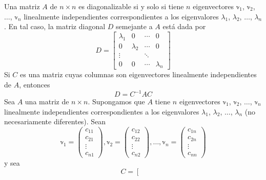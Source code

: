 \begin{theorem}
    Una matriz $A$ de $n \times n$ es diagonalizable si y solo si tiene $n$ eigenvectores $\mathbb{v}_1$, $\mathbb{v}_2$, $\dots$, $\mathbb{v}_n$ linealmente independientes correspondientes a los eigenvalores $\lambda_1$, $\lambda_2$, $\dots$, $\lambda_n$. En tal caso, la matriz diagonal $D$ semejante a $A$ está dada por
    $$D = \begin{bmatrix}
        \lambda_1 & 0 & \cdots & 0 \\
        0 & \lambda_2 & \cdots & 0 \\
        \vdots & & \ddots & \\
        0 & 0 & \cdots & \lambda_n
    \end{bmatrix}$$
    Si $C$ es una matriz cuyas columnas son eigenvectores linealmente independientes de $A$, entonces
    $$D = C^{-1}AC$$
    \demostracion Sea $A$ una matriz de $n \times n$. Supongamos que $A$ tiene $n$ eigenvectores $\mathbb{v}_1$, $\mathbb{v}_2$, $\dots$, $\mathbb{v}_n$ linealmente independientes correspondientes a los eigenvalores $\lambda_1$, $\lambda_2$, $\dots$, $\lambda_n$ (no necesariamente diferentes). Sean
    $$\mathbb{v}_1 = \begin{pmatrix} c_{11} \\ c_{21} \\ \vdots \\ c_{n1} \end{pmatrix}, \mathbb{v}_2 = \begin{pmatrix} c_{12} \\ c_{22} \\ \vdots \\ c_{n2} \end{pmatrix}, \dots, \mathbb{v}_n = \begin{pmatrix} c_{1n} \\ c_{2n} \\ \vdots \\ c_{nn} \end{pmatrix}$$
    y sea
    \begin{equation*}
        C = \left[\begin{array}{cccc}

\end{array}
\end{equation*}
\end{theorem}
